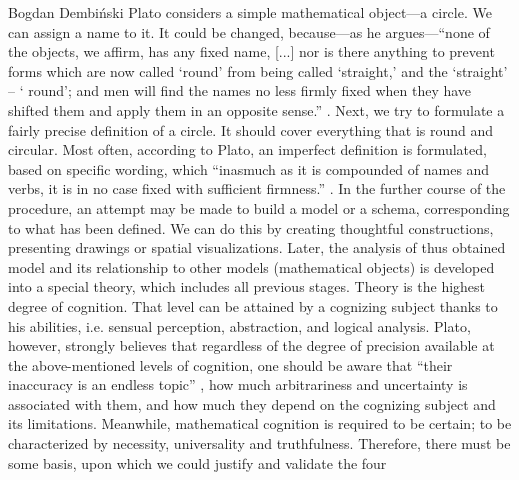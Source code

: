\begin{artengenv}{Bogdan Dembiński}
Plato considers a simple mathematical object---a circle. We can assign a name to it. It could be changed, because---as he
argues---``none of the objects, we affirm, has any fixed name, [...] nor is there anything to prevent forms which are now
called ‘round’ from being called ‘straight,’ and the ‘straight’ -- ‘%
round’; and men will find the names no less firmly fixed when they have shifted them and apply them in an opposite
sense.''
\parencite[\textit{Letters}, 343b]{plato_platonis_1955}.
Next, we try to formulate a fairly precise definition
of a circle. It should cover everything that is round and circular. Most often, according to Plato, an imperfect
definition is formulated, based on specific wording, which ``inasmuch as it is compounded of names and verbs, it is in
no case fixed with sufficient firmness.''
\parencite[\textit{Letters}, 343b]{plato_platonis_1955}.
In the further course
of the procedure, an attempt may be made to build a model or a schema, corresponding to what has been defined. We can
do this by creating thoughtful constructions, presenting drawings or spatial visualizations. Later, the analysis of
thus obtained model and its relationship to other models (mathematical objects) is developed into a special theory,
which includes all previous stages. Theory is the highest degree of cognition.  That level can be attained
by a cognizing subject thanks to his abilities, i.e. sensual perception, abstraction, and logical analysis.
Plato, however, strongly
believes that regardless of the degree of precision available at the above-mentioned levels of cognition, one should be
aware that ``their inaccuracy is an endless topic''
\parencite[\textit{Letters}, 343b]{plato_platonis_1955},
how much
arbitrariness and uncertainty is associated with them, and how much they depend on the cognizing subject and its
limitations. Meanwhile, mathematical cognition is required to be certain; to be characterized by necessity,
universality and truthfulness. Therefore, there must be some basis, upon which we could justify and validate the four

\end{artengenv}
